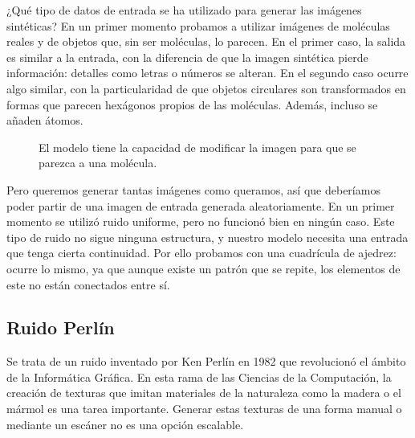 ¿Qué tipo de datos de entrada se ha utilizado para generar las imágenes sintéticas? En un primer momento probamos a utilizar imágenes de moléculas reales y de objetos que, sin ser moléculas, lo parecen. En el primer caso, la salida es similar a la entrada, con la diferencia de que la imagen sintética pierde información: detalles como letras o números se alteran. En el segundo caso ocurre algo similar, con la particularidad de que objetos circulares son transformados en formas que parecen hexágonos propios de las moléculas. Además, incluso se añaden átomos.

\begin{figure}[H]
\centering
    \caption{El modelo tiene la capacidad de modificar la imagen para que se parezca a una molécula.}
\end{figure}

Pero queremos generar tantas imágenes como queramos, así que deberíamos poder partir de una imagen de entrada generada aleatoriamente. En un primer momento se utilizó ruido uniforme, pero no funcionó bien en ningún caso. Este tipo de ruido no sigue ninguna estructura, y nuestro modelo necesita una entrada que tenga cierta continuidad. Por ello probamos con una cuadrícula de ajedrez: ocurre lo mismo, ya que aunque existe un patrón que se repite, los elementos de este no están conectados entre sí.

\subsection{Ruido Perlín}
Se trata de un ruido inventado por Ken Perlín en 1982 que revolucionó el ámbito de la Informática Gráfica. En esta rama de las Ciencias de la Computación, la creación de texturas que imitan materiales de la naturaleza como la madera o el mármol es una tarea importante. Generar estas texturas de una forma manual o mediante un escáner no es una opción escalable.

